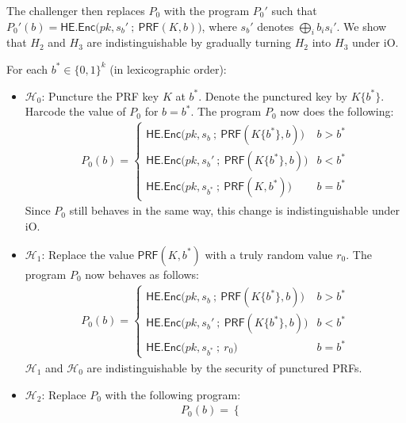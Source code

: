 \documentclass{article}
\begin{document}
\begin{itemize}
    The challenger then replaces $P_0$ with the program $P_0'$ such that $P_0'(b) = \textsf{HE.Enc}\big( pk, s_b' \:;\: \textsf{PRF}(K, b) \big)$, where $s_b'$ denotes $\bigoplus_i b_i s_i'$. We show that $H_2$ and $H_3$ are indistinguishable by gradually turning $H_2$ into $H_3$ under \textsf{iO}.
    
    For each $b^* \in \{0,1\}^k$ (in lexicographic order):
    \begin{itemize}
        \item $\mathcal{H}_0$: Puncture the PRF key $K$ at $b^*$. Denote the punctured key by $K\{b^*\}$. Harcode the value of $P_0$ for $b = b^*$. The program $P_0$ now does the following:
        \begin{align}
            P_0(b) =
            \begin{cases}
                \textsf{HE.Enc}\big( pk, s_b \:;\: \textsf{PRF}(K\{b^*\}, b) \big) & b > b^* \\
                \textsf{HE.Enc}\big( pk, s_b' \:;\: \textsf{PRF}(K\{b^*\}, b) \big) & b < b^* \\
                \textsf{HE.Enc}\big( pk, s_{b^*} \:;\: \textsf{PRF}(K, b^*) \big) & b = b^*
            \end{cases}
        \end{align}
        Since $P_0$ still behaves in the same way, this change is indistinguishable under \textsf{iO}.
        \item $\mathcal{H}_1$: Replace the value $\textsf{PRF}(K, b^*)$ with a truly random value $r_0$. The program $P_0$ now behaves as follows:
        \begin{align}
            P_0(b) =
            \begin{cases}
                \textsf{HE.Enc}\big( pk, s_b \:;\: \textsf{PRF}(K\{b^*\}, b) \big) & b > b^* \\
                \textsf{HE.Enc}\big( pk, s_b' \:;\: \textsf{PRF}(K\{b^*\}, b) \big) & b < b^* \\
                \textsf{HE.Enc}\big( pk, s_{b^*} \:;\: r_0 \big) & b = b^*
            \end{cases}
        \end{align}
        $\mathcal{H}_1$ and $\mathcal{H}_0$ are indistinguishable by the security of punctured PRFs.
        \item $\mathcal{H}_2$: Replace $P_0$ with the following program:
        \begin{align}
            P_0(b) =
            \begin{cases}

\end{cases}
\end{align}
\end{itemize}
\end{itemize}
\end{document}
